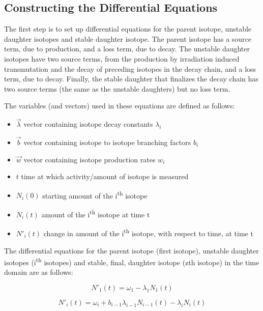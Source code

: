 \eqLaplaceTransform


\subsection{Constructing the Differential Equations}

The first step is to set up differential equations for the parent isotope, unstable daughter isotopes and stable daughter isotope.  The parent isotope has a source term, due to production, and a loss term, due to decay.  The unstable daughter isotopes have two source terms, from the production by irradiation induced transmutation and the decay of preceding isotopes in the decay chain, and a loss term, due to decay.  Finally, the stable daughter that finalizes the decay chain has two source terms (the same as the unstable daughters) but no loss term.

The variables (and vectors) used in these equations are defined as follows:
\begin{itemize}
	\item $\vec{\lambda}$  vector containing isotope decay constants $\lambda_i$
	\item $\vec{b}$  vector containing isotope to isotope branching factors $b_i$
	\item $\vec{w}$  vector containing isotope production rates $w_i$
	\item $t$  time at which activity/amount of isotope is measured
	\item $N_{i}(0)$ starting amount of the i\textsuperscript{th} isotope
	\item $N_{i}(t)$ amount of the i\textsuperscript{th} isotope at time t
	\item $N'_{i}(t)$ change in amount of the i\textsuperscript{th} isotope, with respect to time, at time t
\end{itemize}

The differential equations for the parent isotope (first isotope), unstable daughter isotopes (i\textsuperscript{th} isotopes) and stable, final, daughter isotope (zth isotope) in the time domain are as follows:

\begin{equation}
N'_{1}(t) = \omega_{1} - \lambda_{1} N_{1} (t)
\end{equation}

\begin{equation}
N'_{i}(t) = \omega_{i} + b_{i-1} \lambda_{i-1} N_{i-1} (t) - \lambda_{i} N_{i} (t)
\end{equation}

